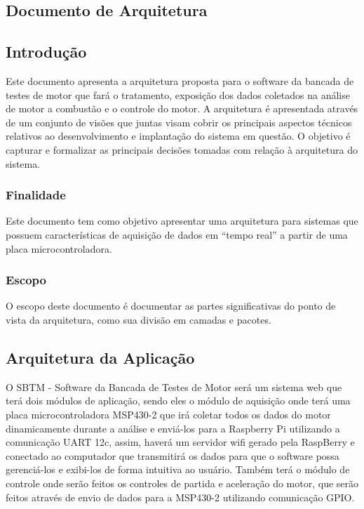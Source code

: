 \begin{anexosenv}
\chapter{Documento de Arquitetura}

\section{Introdução}

Este documento apresenta a arquitetura proposta para o software da bancada de testes de motor que fará o tratamento, exposição dos dados coletados na análise de motor a combustão e o controle do motor. A arquitetura é apresentada através de um conjunto de visões que juntas visam cobrir os principais aspectos técnicos relativos ao desenvolvimento e implantação do sistema em questão. O objetivo é capturar e formalizar as principais decisões tomadas com relação à arquitetura do sistema.

\subsection{Finalidade}

Este documento tem como objetivo apresentar uma arquitetura para sistemas que possuem características de aquisição de dados em “tempo real” a partir de uma placa microcontroladora.

\subsection{Escopo}

O escopo deste documento é documentar as partes significativas do ponto de vista da arquitetura, como sua divisão em camadas e pacotes.

\section{Arquitetura da Aplicação}

O  SBTM - Software da Bancada de Testes de Motor será um sistema web que terá dois módulos de aplicação, sendo eles o módulo de aquisição onde terá uma placa microcontroladora MSP430-2 que irá coletar todos os dados do motor dinamicamente durante a análise e enviá-los para a Raspberry Pi utilizando a comunicação UART 12c, assim, haverá um servidor wifi gerado pela RaspBerry e conectado ao computador que transmitirá os dados para que o software possa gerenciá-los e exibi-los de forma intuitiva ao usuário. Também terá o módulo de controle onde serão feitos os controles de partida e aceleração do motor, que serão feitos através de envio de dados para a MSP430-2 utilizando comunicação GPIO.


\end{anexosenv}

